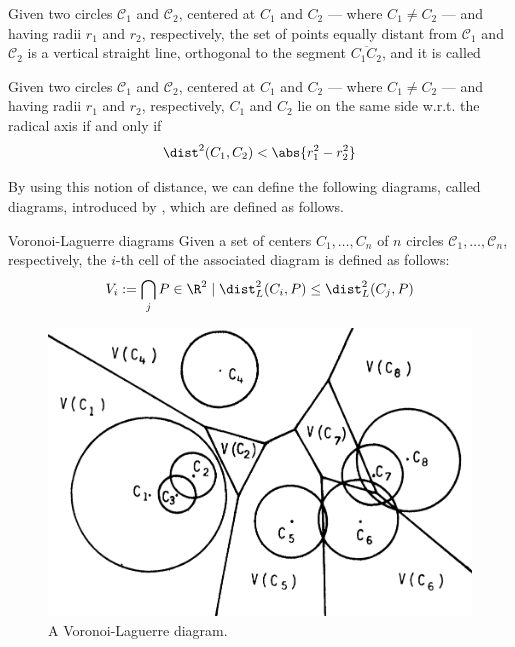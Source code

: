 \documentclass[a4paper, 12pt]{report}
\begin{document}
    \begin{framedlem}{}
        Given two circles $\mathscr C_1$ and $\mathscr C_2$, centered at $C_1$ and $C_2$ --- where $C_1 \neq C_2$ --- and having radii $r_1$ and $r_2$, respectively, the set of points equally distant from $\mathscr C_1$ and $\mathscr C_2$ is a vertical straight line, orthogonal to the segment $\overline{C_1 C_2}$, and it is called 
    \end{framedlem}


    \begin{framedlem}{}
        Given two circles $\mathscr C_1$ and $\mathscr C_2$, centered at $C_1$ and $C_2$ --- where $C_1 \neq C_2$ --- and having radii $r_1$ and $r_2$, respectively, $C_1$ and $C_2$ lie on the same side w.r.t. the radical axis if and only if $$\dist^2(C_1, C_2) < \abs{r_1^2 - r_2^2}$$
    \end{framedlem}


    By using this notion of distance, we can define the following diagrams, called  diagrams, introduced by \textcite{imai}, which are defined as follows.

    \begin{frameddefn}{Voronoi-Laguerre diagrams}
        Given a set of centers $C_1, \ldots, C_n$ of $n$ circles $\mathscr C_1, \ldots, \mathscr C_n$, respectively, the $i$-th cell of the associated  diagram is defined as follows: $$V_i := \bigcap_j{P \in \R^2 \mid \dist_L^2(C_i, P) \le \dist_L^2(C_j, P)}$$
    \end{frameddefn}
     
    \begin{figure}[H]
        \centering
        \includegraphics[scale=0.35]{../assets/voronoi_laguerre.png}
        
        \caption{A Voronoi-Laguerre diagram.} \label{voronoi_laguerre}
    \end{figure}
\end{document}
